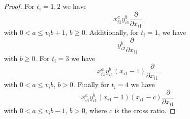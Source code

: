 \documentclass[a4paper, reqno, twoside]{amsart}
\theoremstyle{definition}
\numberwithin{equation}{section}
\begin{document}
\begin{proof}
For $t_i=1, 2$ we have
\begin{equation}\label{equation:partial-x-1-2}
x_{i1}^a y_{i1}^b \frac{\partial}{\partial x_{i1}}
\end{equation}
with $0 < a \le v_ib+1$, $b \ge 0$. Additionally, for $t_i=1$, we have
\begin{equation}\label{equation:partial-x-1}
y_{i2}^b \frac{\partial}{\partial x_{i1}}
\end{equation}
with $b \ge 0$. For $t_i=3$ we have
\begin{equation}\label{equation:partial-x-3}
x_{i1}^a y_{i1}^b (x_{i1}-1) \frac{\partial}{\partial x_{i1}}
\end{equation}
with $0 < a \le v_ib$, $b > 0$. Finally for $t_i=4$ we have
\begin{equation}\label{equation:partial-x-4}
x_{i1}^ay_{i1}^b (x_{i1}-1)(x_{i1}-c) \frac{\partial}{\partial x_{i1}}
\end{equation}
with $0 < a \le v_ib-1$, $b > 0$, where $c$ is the cross ratio.


\end{proof}
\end{document}
